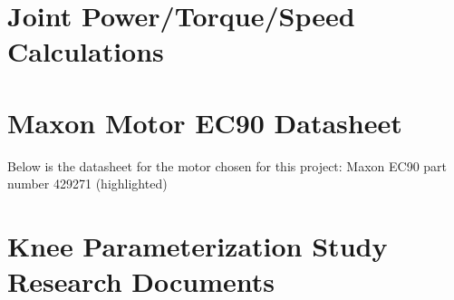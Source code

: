 \appendix

\chapter{Joint Power/Torque/Speed Calculations}
\label{apx:JointPowerTorqueSpeedCalcs}



\chapter{Maxon Motor EC90 Datasheet}
\label{apx:EC90Datasheet}
Below is the datasheet for the motor chosen for this project: Maxon EC90 part number 429271 (highlighted)


\chapter{Knee Parameterization Study Research Documents}
\label{apx:ParamStudyDocs}

